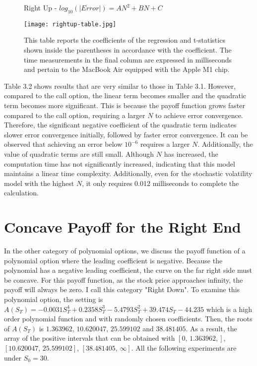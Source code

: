 \begin{figure}[ht]
    \begin{table}[H]
      \centering
      \caption[$log_{10}(|Error|)=AN^2+BN+C$]{Right Up - $log_{10}(|Error|)=AN^2+BN+C$}
    \end{table}
    \centering
        \texttt{[image: rightup-table.jpg]}
    \caption*{\small{This table reports the coefficients of the regression and t-statistics shown inside the parentheses in accordance with the coefficient. The time measurements in the final column are expressed in milliseconds and pertain to the MacBook Air equipped with the Apple M1 chip.}}
\end{figure}

Table 3.2 shows results that are very similar to those in Table 3.1. However, compared to the call option, the linear term becomes smaller and the quadratic term becomes more significant. This is because the payoff function grows faster compared to the call option, requiring a larger $N$ to achieve error convergence. Therefore, the significant negative coefficient of the quadratic term indicates slower error convergence initially, followed by faster error convergence. It can be observed that achieving an error below $10^{-6}$ requires a larger $N$. Additionally, the value of quadratic terms are still small. Although $N$ has increased, the computation time has not significantly increased, indicating that this model maintains a linear time complexity. Additionally, even for the stochastic volatility model with the highest $N$, it only requires 0.012 milliseconds to complete the calculation.



\section{Concave Payoff for the Right End}
In the other category of polynomial options, we discuss the payoff function of a polynomial option where the leading coefficient is negative. Because the polynomial has a negative leading coefficient, the curve on the far right side must be concave. For this payoff function, as the stock price approaches infinity, the payoff will always be zero. I call this category "Right Down".
To examine this polynomial option, the setting is $A(S_T)=-0.0031S_T^4+0.2358S_T^3-5.4793S_T^2+39.474S_T-44.235$ which is a high order polynomial function and with randomly chosen coefficients. Then, the roots of $A(S_T)$ is $1.363962$, $10.620047$, $25.599102$ and $38.481405$. As a result, the array of the positive intervals that can be obtained with $\left[0, \, 1.363962,\right]$, $ \left[10.620047, \, 25.599102\right]$, $\left[ 38.481405, \,\infty \right]$. All the following experiments are under $S_0=30$.

